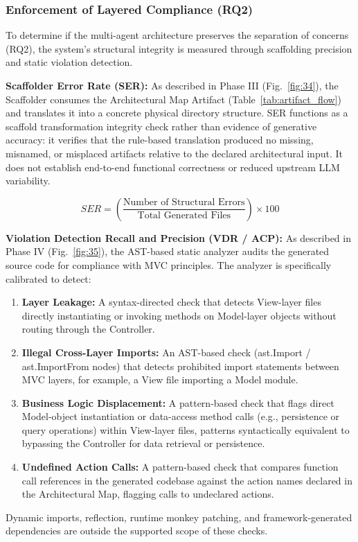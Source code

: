 \subsubsection{Enforcement of Layered Compliance (RQ2)}

To determine if the multi-agent architecture preserves the separation of concerns (RQ2), the system's structural integrity is measured through scaffolding precision and static violation detection.

\textbf{Scaffolder Error Rate (SER):} As described in Phase III (Fig.~\ref{fig:34}), the Scaffolder consumes the Architectural Map Artifact (Table~\ref{tab:artifact_flow}) and translates it into a concrete physical directory structure. SER functions as a scaffold transformation integrity check rather than evidence of generative accuracy: it verifies that the rule-based translation produced no missing, misnamed, or misplaced artifacts relative to the declared architectural input. It does not establish end-to-end functional correctness or reduced upstream LLM variability.

\begin{equation} \label{eq:ser}
SER = \left( \frac{\text{Number of Structural Errors}}{\text{Total Generated Files}} \right) \times 100
\end{equation}

\textbf{Violation Detection Recall and Precision (VDR / ACP):} As described in Phase IV (Fig.~\ref{fig:35}), the AST-based static analyzer audits the generated source code for compliance with MVC principles. The analyzer is specifically calibrated to detect:
\begin{enumerate}
    \item \textbf{Layer Leakage:} A syntax-directed check that detects View-layer files directly instantiating or invoking methods on Model-layer objects without routing through the Controller.
    \item \textbf{Illegal Cross-Layer Imports:} An AST-based check (ast.Import / ast.ImportFrom nodes) that detects prohibited import statements between MVC layers, for example, a View file importing a Model module.
    \item \textbf{Business Logic Displacement:} A pattern-based check that flags direct Model-object instantiation or data-access method calls (e.g., persistence or query operations) within View-layer files, patterns syntactically equivalent to bypassing the Controller for data retrieval or persistence.
    \item \textbf{Undefined Action Calls:} A pattern-based check that compares function call references in the generated codebase against the action names declared in the Architectural Map, flagging calls to undeclared actions.
\end{enumerate}
Dynamic imports, reflection, runtime monkey patching, and framework-generated dependencies are outside the supported scope of these checks.

